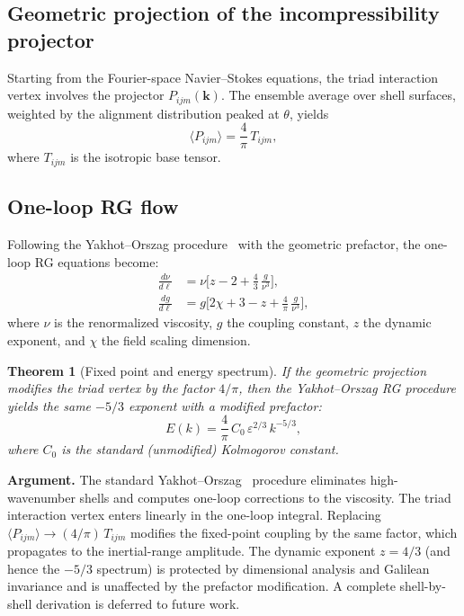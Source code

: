 \documentclass[12pt,a4paper]{article}
\newtheorem{theorem}{Theorem}
\begin{document}
\subsection{Geometric projection of the incompressibility projector}

Starting from the Fourier-space Navier--Stokes equations, the triad interaction vertex involves the projector $P_{ijm}(\bm{k})$.
The ensemble average over shell surfaces, weighted by the alignment distribution peaked at $\theta$, yields
\begin{equation}
\langle P_{ijm}\rangle = \frac{4}{\pi}\,T_{ijm},
\end{equation}
where $T_{ijm}$ is the isotropic base tensor.

\subsection{One-loop RG flow}

Following the Yakhot--Orszag procedure~\cite{Yakhot1986} with the geometric prefactor, the one-loop RG equations become:
\begin{align}
\frac{d\nu}{d\ell} &= \nu\biggl[z - 2 + \frac{4}{3}\,\frac{g}{\nu^3}\biggr], \label{eq:rg1} \\[6pt]
\frac{dg}{d\ell} &= g\biggl[2\chi + 3 - z + \frac{4}{\pi}\,\frac{g}{\nu^3}\biggr], \label{eq:rg2}
\end{align}
where $\nu$ is the renormalized viscosity, $g$ the coupling constant, $z$ the dynamic exponent, and $\chi$ the field scaling dimension.

\begin{theorem}[Fixed point and energy spectrum]
\label{thm:rg}
If the geometric projection modifies the triad vertex by the factor $4/\pi$, then the Yakhot--Orszag RG procedure yields the same $-5/3$ exponent with a modified prefactor:
\begin{equation}
\label{eq:spectrum}
E(k) = \frac{4}{\pi}\,C_0\,\varepsilon^{2/3}\,k^{-5/3},
\end{equation}
where $C_0$ is the standard (unmodified) Kolmogorov constant.
\end{theorem}

\noindent\textbf{Argument.}
The standard Yakhot--Orszag~\cite{Yakhot1986} procedure eliminates high-wavenumber shells and computes one-loop corrections to the viscosity.
The triad interaction vertex enters linearly in the one-loop integral.
Replacing $\langle P_{ijm}\rangle \to (4/\pi)\,T_{ijm}$ modifies the fixed-point coupling by the same factor, which propagates to the inertial-range amplitude.
The dynamic exponent $z = 4/3$ (and hence the $-5/3$ spectrum) is protected by dimensional analysis and Galilean invariance and is unaffected by the prefactor modification.
A complete shell-by-shell derivation is deferred to future work.
\end{document}
